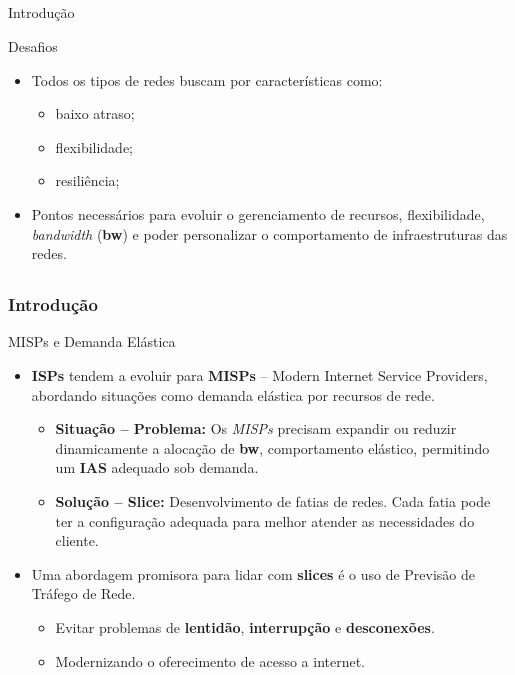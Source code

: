 \documentclass[aspectratio=169]{beamer}
\begin{document}
\subsection{}
\begin{frame}{Introdução}
    \begin{block}{Desafios}
\begin{itemize}
    \item Todos os tipos de redes buscam por características como:
    \begin{itemize}[triangle]
        \item baixo atraso;
        \item flexibilidade;
        \item resiliência;
    \end{itemize}
    \item Pontos necessários para evoluir o gerenciamento de recursos, flexibilidade, \textit{bandwidth} (\textbf{bw}) e poder personalizar o comportamento de infraestruturas das redes.
\end{itemize}
\end{block}
\end{frame}

\subsection{}
\begin{frame}
\frametitle{Introdução}
\begin{block}{MISPs e Demanda Elástica}
    \begin{itemize}
    \item \textbf{ISPs} tendem a evoluir para \textbf{MISPs} -- Modern Internet Service Providers, abordando situações como demanda elástica por recursos de rede.
        \begin{itemize}[triangle]\onehalfspacing
            \item \textbf{Situação -- Problema:} Os \textit{MISPs} precisam expandir ou reduzir dinamicamente a alocação de \textbf{bw}, comportamento elástico, permitindo um \textbf{IAS} adequado sob demanda.
            \item \textbf{Solução -- Slice:} Desenvolvimento de fatias de redes. Cada fatia pode ter a configuração adequada para melhor atender as necessidades do cliente.
        \end{itemize}
     
    \item Uma abordagem promisora para lidar com \textbf{slices} é o uso de Previsão de Tráfego de Rede.
        \begin{itemize}[square]
            \item Evitar problemas de \textbf{lentidão}, \textbf{interrupção} e \textbf{desconexões}. 
            \item Modernizando o oferecimento de acesso a internet.
        \end{itemize}
    \end{itemize}
\end{block}
\end{frame}
\end{document}
